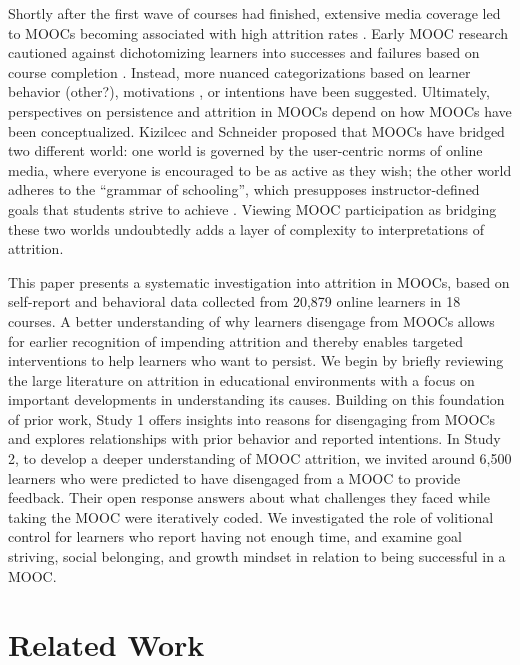 \documentclass{sigchi}\usepackage[]{graphicx}\usepackage[]{color}
\begin{document}
Shortly after the first wave of courses had finished, extensive media coverage led to MOOCs becoming associated with high attrition rates \cite{lewin2013after,parr2013mooc,guthrie2013moocs}. Early MOOC research cautioned against dichotomizing learners into successes and failures based on course completion \cite{kizilcec2013deconstructing,rivard2013measuring}. Instead, more nuanced categorizations based on learner behavior \cite{kizilcec2013deconstructing,clow2013moocs} (other?), motivations \cite{kizilcec2015motivation}, or intentions \cite{wilkowski2014student} have been suggested. Ultimately, perspectives on persistence and attrition in MOOCs depend on how MOOCs have been conceptualized. Kizilcec and Schneider \citeyear{kizilcec2015motivation} proposed that MOOCs have bridged two different world: one world is governed by the user-centric norms of online media, where everyone is encouraged to be as active as they wish; the other world adheres to the ``grammar of schooling'', which presupposes instructor-defined goals that students strive to achieve \cite{tyack1994grammar}. Viewing MOOC participation as bridging these two worlds undoubtedly adds a layer of complexity to interpretations of attrition.

This paper presents a systematic investigation into attrition in MOOCs, based on self-report and behavioral data collected from 20,879 online learners in 18 courses. A better understanding of why learners disengage from MOOCs allows for earlier recognition of impending attrition and thereby enables targeted interventions to help learners who want to persist. We begin by briefly reviewing the large literature on attrition in educational environments with a focus on important developments in understanding its causes. Building on this foundation of prior work, Study 1 offers insights into reasons for disengaging from MOOCs and explores relationships with prior behavior and reported intentions. In Study 2, to develop a deeper understanding of MOOC attrition, we invited around 6,500 learners who were predicted to have disengaged from a MOOC to provide feedback. Their open response answers about what challenges they faced while taking the MOOC were iteratively coded. We investigated the role of volitional control for learners who report having not enough time, and examine goal striving, social belonging, and growth mindset in relation to being successful in a MOOC.


\section{Related Work}
\end{document}
